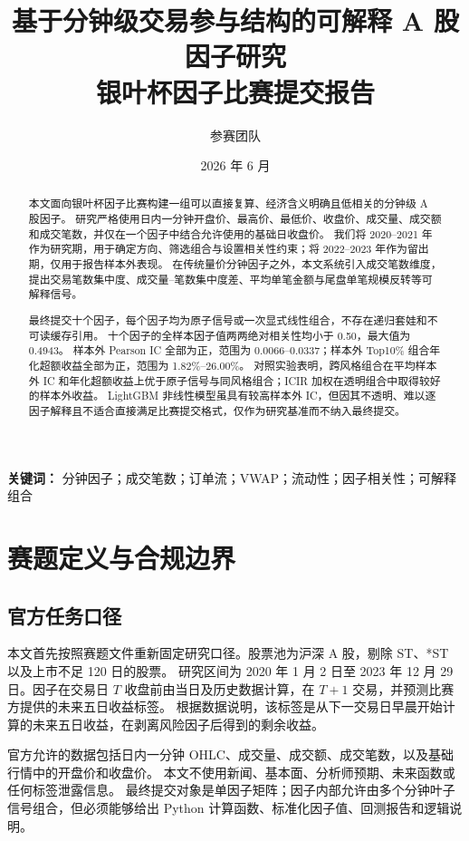 \documentclass[UTF8,11pt,a4paper]{ctexart}
\title{\bfseries 基于分钟级交易参与结构的可解释 A 股因子研究\\
\large 银叶杯因子比赛提交报告}
\author{参赛团队}
\date{2026 年 6 月}
\begin{document}
\maketitle

\begin{abstract}
本文面向银叶杯因子比赛构建一组可以直接复算、经济含义明确且低相关的分钟级 A 股因子。
研究严格使用日内一分钟开盘价、最高价、最低价、收盘价、成交量、成交额和成交笔数，并仅在一个因子中结合允许使用的基础日收盘价。
我们将 2020--2021 年作为研究期，用于确定方向、筛选组合与设置相关性约束；将 2022--2023 年作为留出期，仅用于报告样本外表现。
在传统量价分钟因子之外，本文系统引入成交笔数维度，提出交易笔数集中度、成交量--笔数集中度差、平均单笔金额与尾盘单笔规模反转等可解释信号。

最终提交十个因子，每个因子均为原子信号或一次显式线性组合，不存在递归套娃和不可读缓存引用。
十个因子的全样本因子值两两绝对相关性均小于 0.50，最大值为 0.4943。
样本外 Pearson IC 全部为正，范围为 0.0066--0.0337；样本外 Top10\% 组合年化超额收益全部为正，范围为 1.82\%--26.00\%。
对照实验表明，跨风格组合在平均样本外 IC 和年化超额收益上优于原子信号与同风格组合；ICIR 加权在透明组合中取得较好的样本外收益。
LightGBM 非线性模型虽具有较高样本外 IC，但因其不透明、难以逐因子解释且不适合直接满足比赛提交格式，仅作为研究基准而不纳入最终提交。
\end{abstract}

\textbf{关键词：} 分钟因子；成交笔数；订单流；VWAP；流动性；因子相关性；可解释组合

\section{赛题定义与合规边界}

\subsection{官方任务口径}

本文首先按照赛题文件重新固定研究口径。股票池为沪深 A 股，剔除 ST、*ST 以及上市不足 120 日的股票。
研究区间为 2020 年 1 月 2 日至 2023 年 12 月 29 日。因子在交易日 $T$ 收盘前由当日及历史数据计算，在 $T+1$ 交易，并预测比赛方提供的未来五日收益标签。
根据数据说明，该标签是从下一交易日早晨开始计算的未来五日收益，在剥离风险因子后得到的剩余收益。

官方允许的数据包括日内一分钟 OHLC、成交量、成交额、成交笔数，以及基础行情中的开盘价和收盘价。
本文不使用新闻、基本面、分析师预期、未来函数或任何标签泄露信息。
最终提交对象是单因子矩阵；因子内部允许由多个分钟叶子信号组合，但必须能够给出 Python 计算函数、标准化因子值、回测报告和逻辑说明。
\end{document}
